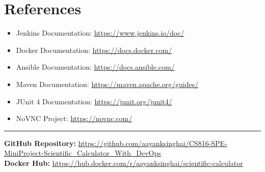 \documentclass[12pt,a4paper]{article}
\begin{document}
\section*{References}

\begin{itemize}
    \item Jenkins Documentation: \url{https://www.jenkins.io/doc/}
    \item Docker Documentation: \url{https://docs.docker.com/}
    \item Ansible Documentation: \url{https://docs.ansible.com/}
    \item Maven Documentation: \url{https://maven.apache.org/guides/}
    \item JUnit 4 Documentation: \url{https://junit.org/junit4/}
    \item NoVNC Project: \url{https://novnc.com/}
\end{itemize}

\vspace{1cm}
\hrule
\vspace{0.5cm}
\begin{center}
    \textbf{GitHub Repository:} \url{https://github.com/aayanksinghai/CS816-SPE-MiniProject-Scientific_Calculator_With_DevOps}\\[0.3cm]
    \textbf{Docker Hub:} \url{https://hub.docker.com/r/aayanksinghai/scientific-calculator}
\end{center}
\end{document}
